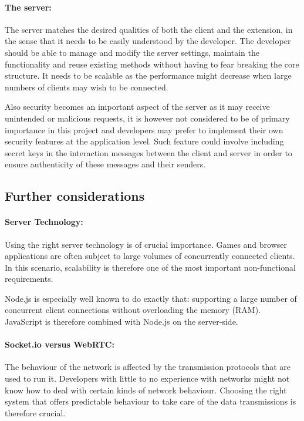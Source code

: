 \documentclass[bsc, 12pt, twoside, singlespacing, parskip, abbrevs, notimes, normalheadings, logo]{styles/infthesis}
\begin{document}
\paragraph*{The server:}
The server matches the desired qualities of both the client and the extension, in the sense that it needs to be easily understood by the developer. The developer should be able to manage and modify the server settings, maintain the functionality and reuse existing methods without having to fear breaking the core structure. It needs to be scalable as the performance might decrease when large numbers of clients may wish to be connected. 

Also security becomes an important aspect of the server as it may receive unintended or malicious requests, it is however not considered to be of primary importance in this project and developers may prefer to implement their own security features at the application level. Such feature could involve including secret keys in the interaction messages between the client and server in order to ensure authenticity of these messages and their senders.


\subsection{Further considerations}
\paragraph*{Server Technology:}
Using the right server technology is of crucial importance. Games and browser applications are often subject to large volumes of concurrently connected clients. In this scenario, scalability is therefore one of the most important non-functional requirements. 

Node.js is especially well known to do exactly that: supporting a large number of concurrent client connections without overloading the memory (RAM). JavaScript is therefore combined with Node.js on the server-side.

\paragraph*{Socket.io versus WebRTC:}
The behaviour of the network is affected by the transmission protocols that are used to run it. Developers with little to no experience with networks might not know how to deal with certain kinds of network behaviour. Choosing the right system that offers predictable behaviour to take care of the data transmissions is therefore crucial.
 
\end{document}
